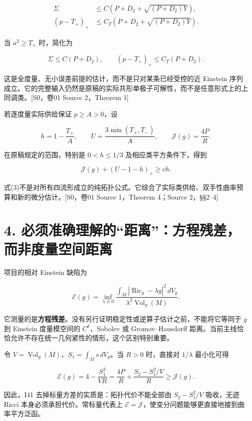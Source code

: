 \documentclass[UTF8,a4paper,11pt,fontset=fandol]{ctexart}
\begin{document}
\[
\boxed{
\begin{aligned}
\Sigma&\le C\left(P+D_2+\sqrt{(P+D_2)Y}\right),\\
(p-T_+)_+&\le C_T\left(P+D_2+\sqrt{(P+D_2)Y}\right).
\end{aligned}}
\tag{1}
\]

当 \(a^2\ge T_+\) 时，简化为

\[
\boxed{\Sigma\le C(P+D_2),\qquad
(p-T_+)_+\le C_T(P+D_2).}
\tag{2}
\]

这是全度量、无小误差前提的估计，而不是只对某条已经受控的近 Einstein
序列成立。它的完整输入仍然是原稿的实际共形单极子可解性，而不是任意形式上的上同调类。{[}S0，卷01
Source 2，Theorem 1{]}

若逐度量实际供给保证 \(p\ge A>0\)，设

\[
h=1-\frac{T_+}{A},\qquad
U=\frac{3\min(T_+,T_-)}A,\qquad
\mathcal J(g)=\frac{4P}{R}.
\]

在原稿规定的范围，特别是 \(0<h\le1/3\) 及相应类平方条件下，得到

\[
\boxed{\mathcal J(g)+(U-1-h)_+\ge ch.}
\tag{3}
\]

式(3)不是对所有四流形成立的纯拓扑公式。它综合了实际类供给、双手性曲率预算和新的微分估计。{[}S0，卷01
Source 1，Theorem 4；Source 2，§§2--4{]}

\section{4.
必须准确理解的``距离''：方程残差，而非度量空间距离}\label{ux5fc5ux987bux51c6ux786eux7406ux89e3ux7684ux8dddux79bbux65b9ux7a0bux6b8bux5deeux800cux975eux5ea6ux91cfux7a7aux95f4ux8dddux79bb}

项目的相对 Einstein 缺陷为

\[
\mathcal E(g)=\inf_{\lambda\ne0}
\frac{\int_M|\operatorname{Ric}_g-\lambda g|^2\,dV_g}
{\lambda^2\operatorname{Vol}_g(M)}.
\tag{4}
\]

它测量的是\textbf{方程残差}。没有另行证明稳定性或逆算子估计之前，不能将它等同于
\(g\) 到 Einstein 度量模空间的 \(C^k\)、Sobolev 或 Gromov--Hausdorff
距离。当前主线恰恰允许不存在统一几何紧性的情形，这个区别特别重要。

令 \(V=\operatorname{Vol}_g(M)\)、\(S_1=\int_Ms\,dV_g\)。当 \(R>0\)
时，直接对 \(1/\lambda\) 最小化可得

\[
\boxed{
\mathcal E(g)=4-\frac{S_1^2}{VR}
=\frac{4P}{R}+\frac{S_2-S_1^2/V}{R}
\ge\mathcal J(g).
}
\tag{5}
\]

因此，I41 去掉标量方差的实质是：拓扑代价不能全部由 \(S_2-S_1^2/V\)
吸收，无迹 Ricci 本身必须承担代价。常标量代表上
\(\mathcal E=\mathcal J\)，使变分问题能够更直接地接到曲率平方泛函。
\end{document}
